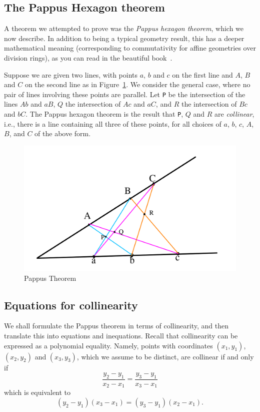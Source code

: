 \documentclass{amsart}
\theoremstyle{plain}
\theoremstyle{definition}
\theoremstyle{remark}
\begin{document}
\subsection{The Pappus Hexagon theorem}
A theorem we attempted to prove was the \emph{Pappus hexagon theorem}, which
we now describe. In addition to being a typical geometry result, this
has a deeper mathematical meaning (corresponding to commutativity for
affine geometries over division rings), as you can read in the beautiful book~\cite{Ar}.

Suppose we are given two lines, with points \(a\), \(b\) and \(c\) on
the first line and \(A\), \(B\) and \(C\) on the second line as in
Figure~\ref{F:pappus}. We consider the general case, where no pair of lines
involving these points are parallel. Let \texttt{P} be the intersection of
the lines \(Ab\) and \(aB\), \(Q\) the intersection of \(Ac\) and
\(aC\), and \(R\) the intersection of \(Bc\) and \(bC\). The Pappus
hexagon theorem is the result that \texttt{P}, \(Q\) and \(R\) are
\emph{collinear}, i.e., there is a line containing all three of these
points, for all choices of \(a\), \(b\), \(c\), \(A\), \(B\), and \(C\)
of the above form.

\begin{figure}
	\centering
	\includegraphics[scale=0.3]{Pappus.png}
	\caption{Pappus Theorem}\label{F:pappus}
\end{figure}

\hypertarget{equations-for-collinearity}{%
	\subsection{Equations for
		collinearity}\label{equations-for-collinearity}}

We shall formulate the Pappus theorem in terms of collinearity, and 
then translate this into equations and inequations.
Recall that collinearity can be
expressed as a polynomial equality. Namely, points with coordinates
\((x_1, y_1)\), \((x_2, y_2)\) and \((x_3, y_3)\), which we assume to be
distinct, are collinear if and only if
\[\frac{y_2 - y_1}{x_2 - x_1} = \frac{y_3 - y_1}{x_3 - x_1}\] which is
equivalent to \[(y_2 - y_1)(x_3 - x_1) = (y_3 - y_1)(x_2 - x_1).\]
\end{document}
